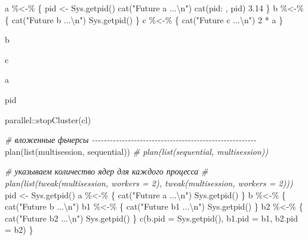 \documentclass[
]{book}
\newenvironment{Shaded}{\begin{snugshade}}{\end{snugshade}}
\newcommand{\AttributeTok}[1]{\textcolor[rgb]{0.77,0.63,0.00}{#1}}
\newcommand{\CommentTok}[1]{\textcolor[rgb]{0.56,0.35,0.01}{\textit{#1}}}
\newcommand{\DecValTok}[1]{\textcolor[rgb]{0.00,0.00,0.81}{#1}}
\newcommand{\FloatTok}[1]{\textcolor[rgb]{0.00,0.00,0.81}{#1}}
\newcommand{\FunctionTok}[1]{\textcolor[rgb]{0.00,0.00,0.00}{#1}}
\newcommand{\NormalTok}[1]{#1}
\newcommand{\OtherTok}[1]{\textcolor[rgb]{0.56,0.35,0.01}{#1}}
\newcommand{\SpecialCharTok}[1]{\textcolor[rgb]{0.00,0.00,0.00}{#1}}
\newcommand{\StringTok}[1]{\textcolor[rgb]{0.31,0.60,0.02}{#1}}
\begin{document}
\begin{Shaded}
\begin{Highlighting}[]
\NormalTok{a }\SpecialCharTok{\%\textless{}{-}\%}\NormalTok{ \{}
\NormalTok{  pid }\OtherTok{\textless{}{-}} \FunctionTok{Sys.getpid}\NormalTok{()}
  \FunctionTok{cat}\NormalTok{(}\StringTok{"Future \textquotesingle{}a\textquotesingle{} ...}\SpecialCharTok{\textbackslash{}n}\StringTok{"}\NormalTok{)}
  \FunctionTok{cat}\NormalTok{(}\StringTok{\textquotesingle{}pid: \textquotesingle{}}\NormalTok{, pid)}
  \FloatTok{3.14}
\NormalTok{\}}
\NormalTok{b }\SpecialCharTok{\%\textless{}{-}\%}\NormalTok{ \{}
  \FunctionTok{cat}\NormalTok{(}\StringTok{"Future \textquotesingle{}b\textquotesingle{} ...}\SpecialCharTok{\textbackslash{}n}\StringTok{"}\NormalTok{)}
  \FunctionTok{Sys.getpid}\NormalTok{()}
\NormalTok{\}}
\NormalTok{c }\SpecialCharTok{\%\textless{}{-}\%}\NormalTok{ \{}
  \FunctionTok{cat}\NormalTok{(}\StringTok{"Future \textquotesingle{}c\textquotesingle{} ...}\SpecialCharTok{\textbackslash{}n}\StringTok{"}\NormalTok{)}
  \DecValTok{2} \SpecialCharTok{*}\NormalTok{ a}
\NormalTok{\}}

\NormalTok{b}

\NormalTok{c}

\NormalTok{a}

\NormalTok{pid}

\NormalTok{parallel}\SpecialCharTok{::}\FunctionTok{stopCluster}\NormalTok{(cl)}


\CommentTok{\# вложенные фьчерсы {-}{-}{-}{-}{-}{-}{-}{-}{-}{-}{-}{-}{-}{-}{-}{-}{-}{-}{-}{-}{-}{-}{-}{-}{-}{-}{-}{-}{-}{-}{-}{-}{-}{-}{-}{-}{-}{-}{-}{-}{-}{-}{-}{-}{-}{-}{-}{-}{-}{-}{-}{-}{-}{-}{-}}
\FunctionTok{plan}\NormalTok{(}\FunctionTok{list}\NormalTok{(multisession, sequential))}
\CommentTok{\# plan(list(sequential, multisession))}

\CommentTok{\# указываем количество ядер для каждого процесса}
\CommentTok{\# plan(list(tweak(multisession, workers = 2), tweak(multisession, workers = 2)))}
\NormalTok{pid }\OtherTok{\textless{}{-}} \FunctionTok{Sys.getpid}\NormalTok{()}
\NormalTok{a }\SpecialCharTok{\%\textless{}{-}\%}\NormalTok{ \{}
  \FunctionTok{cat}\NormalTok{(}\StringTok{"Future \textquotesingle{}a\textquotesingle{} ...}\SpecialCharTok{\textbackslash{}n}\StringTok{"}\NormalTok{)}
  \FunctionTok{Sys.getpid}\NormalTok{()}
\NormalTok{  \}}
\NormalTok{b }\SpecialCharTok{\%\textless{}{-}\%}\NormalTok{ \{}
  \FunctionTok{cat}\NormalTok{(}\StringTok{"Future \textquotesingle{}b\textquotesingle{} ...}\SpecialCharTok{\textbackslash{}n}\StringTok{"}\NormalTok{)}
\NormalTok{  b1 }\SpecialCharTok{\%\textless{}{-}\%}\NormalTok{ \{}
    \FunctionTok{cat}\NormalTok{(}\StringTok{"Future \textquotesingle{}b1\textquotesingle{} ...}\SpecialCharTok{\textbackslash{}n}\StringTok{"}\NormalTok{)}
    \FunctionTok{Sys.getpid}\NormalTok{()}
\NormalTok{    \}}
\NormalTok{  b2 }\SpecialCharTok{\%\textless{}{-}\%}\NormalTok{ \{}
    \FunctionTok{cat}\NormalTok{(}\StringTok{"Future \textquotesingle{}b2\textquotesingle{} ...}\SpecialCharTok{\textbackslash{}n}\StringTok{"}\NormalTok{)}
    \FunctionTok{Sys.getpid}\NormalTok{()}
\NormalTok{    \}}
  \FunctionTok{c}\NormalTok{(}\AttributeTok{b.pid =} \FunctionTok{Sys.getpid}\NormalTok{(), }\AttributeTok{b1.pid =}\NormalTok{ b1, }\AttributeTok{b2.pid =}\NormalTok{ b2)}
\NormalTok{  \}}


\end{Highlighting}
\end{Shaded}
\end{document}
